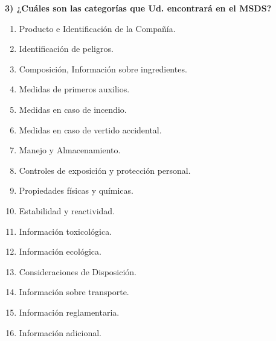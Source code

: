\documentclass[letterpaper,11pt]{article}
\begin{document}
\textbf{3) ¿Cuáles son las categorías que Ud. encontrará en el MSDS?}
\begin{enumerate}
    \item Producto e Identificación de la Compañía.
    \item Identificación de peligros.
    \item Composición, Información sobre ingredientes.
    \item Medidas de primeros auxilios.
    \item Medidas en caso de incendio.
    \item Medidas en caso de vertido accidental.
    \item Manejo y Almacenamiento.
    \item Controles de exposición y protección personal.
    \item Propiedades físicas y químicas.
    \item Estabilidad y reactividad.
    \item  Información toxicológica.
    \item Información ecológica.
    \item Consideraciones de Disposición.
    \item Información sobre transporte.
    \item Información reglamentaria.
    \item Información adicional.
\end{enumerate}
 
\end{document}
